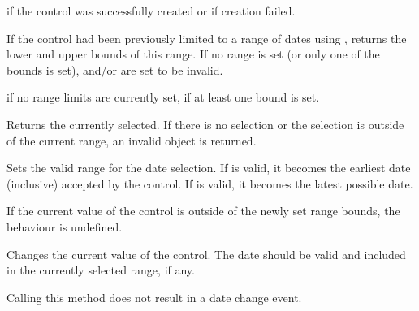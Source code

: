 



\true if the control was successfully created or \false if creation failed.


\label{wxdatepickerctrlgetrange}


If the control had been previously limited to a range of dates using 
, returns the lower and upper
bounds of this range. If no range is set (or only one of the bounds is set),
  and/or  are set to be invalid.





\false if no range limits are currently set, \true if at least one bound is
set.


\label{wxdatepickerctrlgetvalue}


Returns the currently selected. If there is no selection or the selection is
outside of the current range, an invalid object is returned.


\label{wxdatepickerctrlsetrange}


Sets the valid range for the date selection. If  is valid, it becomes
the earliest date (inclusive) accepted by the control. If  is valid,
it becomes the latest possible date.


If the current value of the control is outside of the newly set range bounds,
the behaviour is undefined.


\label{wxdatepickerctrlsetvalue}


Changes the current value of the control. The date should be valid and included
in the currently selected range, if any.

Calling this method does not result in a date change event.

